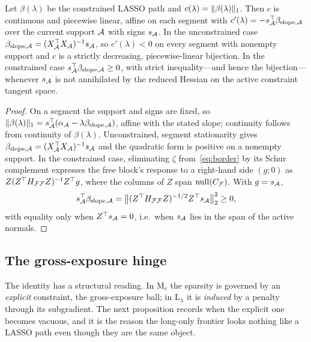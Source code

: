 \begin{proposition}
\label{prop:reg}
Let $\beta(\lambda)$ be the constrained LASSO path and
$c(\lambda) = \lVert \beta(\lambda) \rVert_1$. Then $c$ is continuous and piecewise linear,
affine on each segment with $c'(\lambda) = -s_{\mathcal{A}}^{\top}\beta_{\mathrm{slope},\mathcal{A}}$
over the current support $\mathcal{A}$ with signs $s_{\mathcal{A}}$. In the unconstrained case
$\beta_{\mathrm{slope},\mathcal{A}} = (X_{\mathcal{A}}^{\top} X_{\mathcal{A}})^{-1}s_{\mathcal{A}}$, so
$c'(\lambda) < 0$ on every segment with nonempty support and $c$ is a strictly
decreasing, piecewise-linear bijection. In the constrained case
$s_{\mathcal{A}}^{\top}\beta_{\mathrm{slope},\mathcal{A}} \ge 0$, with strict inequality---and hence
the bijection---whenever $s_{\mathcal{A}}$ is not annihilated by the reduced Hessian on the
active constraint tangent space.
\end{proposition}

\begin{proof}
On a segment the support and signs are fixed, so
$\lVert \beta(\lambda) \rVert_1 = s_{\mathcal{A}}^{\top}(\alpha_{\mathcal{A}} - \lambda\beta_{\mathrm{slope},\mathcal{A}})$,
affine with the stated slope; continuity follows from continuity of $\beta(\lambda)$.
Unconstrained, segment stationarity gives
$\beta_{\mathrm{slope},\mathcal{A}} = (X_{\mathcal{A}}^{\top} X_{\mathcal{A}})^{-1}s_{\mathcal{A}}$ and the
quadratic form is positive on a nonempty support. In the constrained case,
eliminating $\zeta$ from~\eqref{eq:border} by its Schur complement expresses the free
block's response to a right-hand side $(g;0)$ as $Z(Z^{\top} H_{\mathcal{F}\mathcal{F}}Z)^{-1}Z^{\top} g$,
where the columns of $Z$ span $\operatorname{null}(C_{\mathcal{F}})$. With $g = s_{\mathcal{A}}$,
\[
  s_{\mathcal{A}}^{\top}\beta_{\mathrm{slope},\mathcal{A}}
  = \bigl\|(Z^{\top} H_{\mathcal{F}\mathcal{F}}Z)^{-1/2}Z^{\top} s_{\mathcal{A}}\bigr\|_2^2 \ge 0,
\]
with equality only when $Z^{\top} s_{\mathcal{A}} = 0$, i.e.\ when $s_{\mathcal{A}}$ lies in the span
of the active normals.
\end{proof}

\subsection{The gross-exposure hinge}

The identity has a structural reading. In $\mathrm{M}_c$ the sparsity is governed by
an \emph{explicit} constraint, the gross-exposure ball; in $\mathrm{L}_\lambda$ it is
\emph{induced} by a penalty through its subgradient. The next proposition records
when the explicit one becomes vacuous, and it is the reason the long-only frontier
looks nothing like a LASSO path even though they are the same object.

